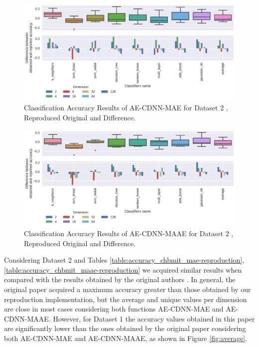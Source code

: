 



\begin{figure}[!ht]
  \centering
  \includegraphics[width=\linewidth]{figure/table_4.pdf}
  \caption{Classification Accuracy Results of AE-CDNN-MAE for Dataset 2 \cite{WenZha:2018}, Reproduced Original and Difference.}
\label{fig:acc-AE-CDNN-MAE-d2}
\end{figure}

\begin{figure}[!ht]
  \centering
  \includegraphics[width=\linewidth]{figure/table_5.pdf}
  \caption{Classification Accuracy Results of AE-CDNN-MAAE for Dataset 2 \cite{WenZha:2018}, Reproduced Original and Difference.}
\label{fig:acc-AE-CDNN-MAAE-d2}
\end{figure}


\newpage

Considering Dataset 2 and Tables \ref{table:accuracy_chbmit_mae-reproduction}, \ref{table:accuracy_chbmit_maae-reproduction} we acquired similar results when compared with the results obtained by the original authors \cite{WenZha:2018}. In general, the original paper acquired a maximum accuracy greater than those obtained by our reproduction implementation, but the average and unique values per dimension are close in most cases considering both functions AE-CDNN-MAE and AE-CDNN-MAAE. However, for Dataset 1 the accuracy values obtained in this paper are significantly lower than the ones obtained by the original paper considering both AE-CDNN-MAE and AE-CDNN-MAAE, as shown in Figure \ref{fig:average}. 

